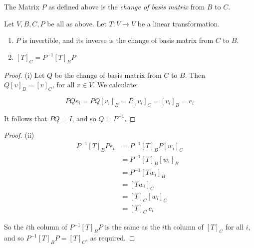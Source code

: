 \documentclass[10pt]{scrartcl}
\begin{document}
\begin{definition}The Matrix $P$ as defined above is the \emph{change of basis matrix} from $B$ to $C$.	
\end{definition}\vspace*{5pt}


\begin{proposition} Let $V, B, C, P$ be all as above. Let $T: V \to V$ be a linear transformation. 
\begin{enumerate}
\item[(i)] $P$ is invertible, and its inverse is the change of basis matrix from $C$ to $B$.
\item[(ii)] $[T]_C = P^{-1}[T]_BP$
\end{enumerate}
\end{proposition}

\begin{proof} (i)
Let $Q$ be the change of basis matrix from $C$ to $B$. Then $Q[v]_B = [v]_C$, for all $v \in V$. We calculate:

\[PQe_i = PQ[v_i]_B = P[v_i]_C = [v_i]_B = e_i\]

It follows that $PQ = I$, and so $Q = P^{-1}$.
\end{proof}

\begin{proof} (ii)
\[\begin{aligned}
P^{-1}[T]_BPe_i &= P^{-1}[T]_BP[w_i]_C\\
 &= P^{-1}[T]_B[w_i]_B\\
 &= P^{-1}[Tw_i]_B \\
 &=  [Tw_i]_C\\
 &= [T]_C[w_i]_C\\
 &= [T]_C~e_i
\end{aligned}
\]

So the $i$th column of $P^{-1}[T]_BP$ is the same as the $i$th column of $[T]_C$ for all $i$, and so $P^{-1}[T]_BP = [T]_C$, as required.
\end{proof}
\end{document}
